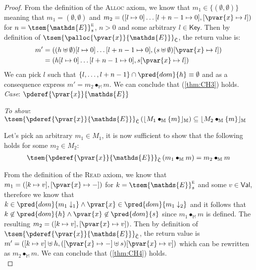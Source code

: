 {\begin{proof}
From the definition of the \textsc{Alloc} axiom, we know that $m_1 \in \{ (\emptyset, \emptyset) \}$ meaning that $m_1 = (\emptyset, \emptyset)$ and $m_2 = \left([l \mapsto 0]\ldots[l + n - 1 \mapsto 0], [\pvar{x} \mapsto l] \right)$ for $n = \tsem{\mathds{E}}_s^\textsc{e}$, $n > 0$ and some arbitrary $l \in \mathsf{Key}$. Then by definition of $\tsem{\palloc{\pvar{x}}{\mathds{E}}}_{\hat{\mathsf{C}}}$, the return value is:
\begin{align*}
	m' &= ((h \uplus \emptyset)[l \mapsto 0]\ldots[l + n - 1 \mapsto 0], (s \uplus \emptyset)[\pvar{x} \mapsto l]) \\
	&= (h[l \mapsto 0]\ldots[l + n - 1 \mapsto 0], s[\pvar{x} \mapsto l])
\end{align*}
We can pick $l$ such that $\{ l, \ldots, l + n -1 \} \cap \pred{dom}{h} \equiv \emptyset$ and as a consequence express $m' = m_2 \bullet_\mathbb{M} m$. We can conclude that (\ref{thm:CH3}) holds. \\

\textit{Case}: $\pderef{\pvar{x}}{\mathds{E}}$

\textit{To show}: $\tsem{\pderef{\pvar{x}}{\mathds{E}}}_{\hat{\mathsf{C}}} \left( \lfloor M_1 \bullet_\mathbb{M} \{m\} \rfloor_\mathbb{M} \right) \subseteq \lfloor M_2 \bullet_\mathbb{M} \{m\} \rfloor_\mathbb{M}$

Let's pick an arbitrary $m_1 \in M_1$, it is now sufficient to show that the following holds for some $m_2 \in M_2$:
\begin{gather}
	\label{thm:CH4} \tsem{\pderef{\pvar{x}}{\mathds{E}}}_{\hat{\mathsf{C}}} \left( m_1 \bullet_\mathbb{M} m\right) = m_2 \bullet_\mathbb{M} m
\end{gather}

From the definition of the \textsc{Read} axiom, we know that $m_1 = ([k \mapsto v], [\pvar{x} \mapsto -])$ for $k = \tsem{\mathds{E}}_s^\textsc{e}$ and some $v \in \mathsf{Val}$, therefore we know that $k \in \pred{dom}{m_1\downarrow_1} \land \pvar{x} \in \pred{dom}{m_1 \downarrow_2}$ and it follows that $k \not\in \pred{dom}{h} \land \pvar{x} \not\in \pred{dom}{s}$ since $m_1 \bullet_\mathbb{M} m$ is defined. The resulting $m_2 = ([k \mapsto v], [\pvar{x} \mapsto v])$. Then by definition of $\tsem{\pderef{\pvar{x}}{\mathds{E}}}_{\hat{\mathsf{C}}}$, the return value is $m' = ([k \mapsto v] \uplus h, ([\pvar{x} \mapsto -] \uplus s)[\pvar{x} \mapsto v])$ which can be rewritten as $m_2 \bullet_\mathbb{M} m$. We can conclude that (\ref{thm:CH4}) holds. \\


\end{proof}}
